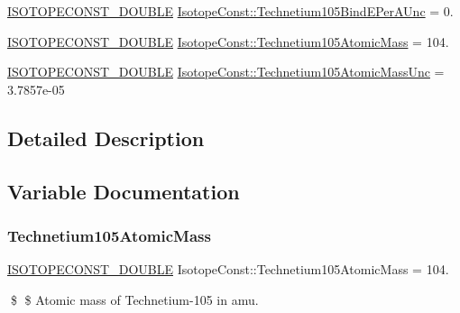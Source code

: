 \begin{DoxyCompactItemize}
\item 
\mbox{\hyperlink{group___isotope_const-_macros_ga8f45a7272ce02c0b4c65c44636ed719a}{I\+S\+O\+T\+O\+P\+E\+C\+O\+N\+S\+T\+\_\+\+D\+O\+U\+B\+LE}} \mbox{\hyperlink{group___isotope_const-_technetium-_tc105_ga3d26eb38d33f420dae0eaf67e355f839}{Isotope\+Const\+::\+Technetium105\+Bind\+E\+Per\+A\+Unc}} = 0.
\item 
\mbox{\hyperlink{group___isotope_const-_macros_ga8f45a7272ce02c0b4c65c44636ed719a}{I\+S\+O\+T\+O\+P\+E\+C\+O\+N\+S\+T\+\_\+\+D\+O\+U\+B\+LE}} \mbox{\hyperlink{group___isotope_const-_technetium-_tc105_ga9ad492682f7674663cdf7afd2b198e1d}{Isotope\+Const\+::\+Technetium105\+Atomic\+Mass}} = 104.
\item 
\mbox{\hyperlink{group___isotope_const-_macros_ga8f45a7272ce02c0b4c65c44636ed719a}{I\+S\+O\+T\+O\+P\+E\+C\+O\+N\+S\+T\+\_\+\+D\+O\+U\+B\+LE}} \mbox{\hyperlink{group___isotope_const-_technetium-_tc105_ga3cc86e094fa90e0d26f405b539cfba25}{Isotope\+Const\+::\+Technetium105\+Atomic\+Mass\+Unc}} = 3.\+7857e-\/05
\end{DoxyCompactItemize}


\subsection{Detailed Description}


\subsection{Variable Documentation}
\mbox{\label{group___isotope_const-_technetium-_tc105_ga9ad492682f7674663cdf7afd2b198e1d}} 
\subsubsection{\texorpdfstring{Technetium105\+Atomic\+Mass}{Technetium105AtomicMass}}
{\footnotesize\ttfamily \mbox{\hyperlink{group___isotope_const-_macros_ga8f45a7272ce02c0b4c65c44636ed719a}{I\+S\+O\+T\+O\+P\+E\+C\+O\+N\+S\+T\+\_\+\+D\+O\+U\+B\+LE}} Isotope\+Const\+::\+Technetium105\+Atomic\+Mass = 104.}

\$ \$ Atomic mass of Technetium-\/105 in amu. \mbox{\label{group___isotope_const-_technetium-_tc105_ga3cc86e094fa90e0d26f405b539cfba25}} 
